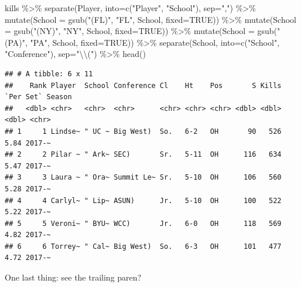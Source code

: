 \documentclass[
]{book}
\newenvironment{Shaded}{\begin{snugshade}}{\end{snugshade}}
\newcommand{\AttributeTok}[1]{\textcolor[rgb]{0.77,0.63,0.00}{#1}}
\newcommand{\ConstantTok}[1]{\textcolor[rgb]{0.00,0.00,0.00}{#1}}
\newcommand{\FunctionTok}[1]{\textcolor[rgb]{0.00,0.00,0.00}{#1}}
\newcommand{\NormalTok}[1]{#1}
\newcommand{\SpecialCharTok}[1]{\textcolor[rgb]{0.00,0.00,0.00}{#1}}
\newcommand{\StringTok}[1]{\textcolor[rgb]{0.31,0.60,0.02}{#1}}
\begin{document}
\begin{Shaded}
\begin{Highlighting}[]
\NormalTok{kills }\SpecialCharTok{\%\textgreater{}\%} 
  \FunctionTok{separate}\NormalTok{(Player, }\AttributeTok{into=}\FunctionTok{c}\NormalTok{(}\StringTok{"Player"}\NormalTok{, }\StringTok{"School"}\NormalTok{), }\AttributeTok{sep=}\StringTok{","}\NormalTok{) }\SpecialCharTok{\%\textgreater{}\%} 
  \FunctionTok{mutate}\NormalTok{(}\AttributeTok{School =} \FunctionTok{gsub}\NormalTok{(}\StringTok{"(FL)"}\NormalTok{, }\StringTok{"FL"}\NormalTok{, School, }\AttributeTok{fixed=}\ConstantTok{TRUE}\NormalTok{)) }\SpecialCharTok{\%\textgreater{}\%}
  \FunctionTok{mutate}\NormalTok{(}\AttributeTok{School =} \FunctionTok{gsub}\NormalTok{(}\StringTok{"(NY)"}\NormalTok{, }\StringTok{"NY"}\NormalTok{, School, }\AttributeTok{fixed=}\ConstantTok{TRUE}\NormalTok{)) }\SpecialCharTok{\%\textgreater{}\%}
  \FunctionTok{mutate}\NormalTok{(}\AttributeTok{School =} \FunctionTok{gsub}\NormalTok{(}\StringTok{"(PA)"}\NormalTok{, }\StringTok{"PA"}\NormalTok{, School, }\AttributeTok{fixed=}\ConstantTok{TRUE}\NormalTok{)) }\SpecialCharTok{\%\textgreater{}\%}
  \FunctionTok{separate}\NormalTok{(School, }\AttributeTok{into=}\FunctionTok{c}\NormalTok{(}\StringTok{"School"}\NormalTok{, }\StringTok{"Conference"}\NormalTok{), }\AttributeTok{sep=}\StringTok{"}\SpecialCharTok{\textbackslash{}\textbackslash{}}\StringTok{("}\NormalTok{) }\SpecialCharTok{\%\textgreater{}\%} 
  \FunctionTok{head}\NormalTok{()}
\end{Highlighting}
\end{Shaded}

\begin{verbatim}
## # A tibble: 6 x 11
##    Rank Player  School Conference Cl    Ht    Pos       S Kills `Per Set` Season
##   <dbl> <chr>   <chr>  <chr>      <chr> <chr> <chr> <dbl> <dbl>     <dbl> <chr> 
## 1     1 Lindse~ " UC ~ Big West)  So.   6-2   OH       90   526      5.84 2017-~
## 2     2 Pilar ~ " Ark~ SEC)       Sr.   5-11  OH      116   634      5.47 2017-~
## 3     3 Laura ~ " Ora~ Summit Le~ Sr.   5-10  OH      106   560      5.28 2017-~
## 4     4 Carlyl~ " Lip~ ASUN)      Jr.   5-10  OH      100   522      5.22 2017-~
## 5     5 Veroni~ " BYU~ WCC)       Jr.   6-0   OH      118   569      4.82 2017-~
## 6     6 Torrey~ " Cal~ Big West)  So.   6-3   OH      101   477      4.72 2017-~
\end{verbatim}

One last thing: see the trailing paren?
\end{document}
